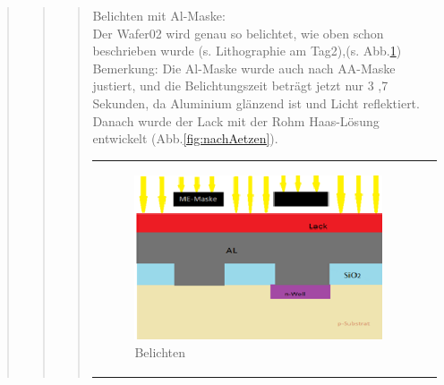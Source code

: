\begin{quote}
\begin{quote}
\begin{quote}
		Belichten mit Al-Maske:\\

		Der Wafer02 wird genau so belichtet, wie oben schon beschrieben wurde 
		(s. Lithographie am Tag2),(s. Abb.\ref{fig:belichten3}) Bemerkung: Die Al-Maske wurde 
		auch nach AA-Maske justiert, und die Belichtungszeit beträgt jetzt nur 3
		,7 Sekunden, da Aluminium glänzend ist und Licht reflektiert.\\

 		Danach wurde der Lack mit der Rohm Haas-Lösung entwickelt 
 		(Abb.\ref{fig:nachAetzen}).
    	
    	\vspace{2em}
    
    		\begin{center}
                \begin{tabular}{ll}

                \hspace{-14em}
                    \begin{minipage}{0.8\textwidth}
                        \begin{figure}[H]
                        \hspace{6em}
                            \includegraphics[scale=0.9, trim = 0cm 0cm 0cm
                            0cm, clip]{./HerstellungBilder/BelichtendurchMEMaske.png}
                            \caption{Belichten}
                           \label{fig:belichten3}
                        \end{figure}

                    \end{minipage}
                    \begin{minipage}{0.6\textwidth} 


\end{minipage}
\end{tabular}
\end{center}
\end{quote}
\end{quote}
\end{quote}

